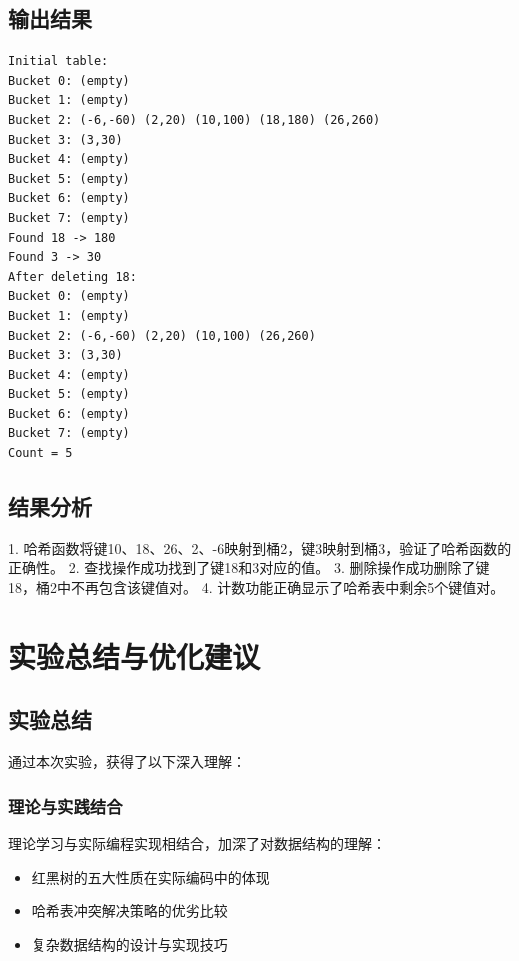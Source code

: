 \documentclass[12pt,a4paper]{article}
\begin{document}
\subsection{输出结果}
\begin{verbatim}
Initial table:
Bucket 0: (empty)
Bucket 1: (empty)
Bucket 2: (-6,-60) (2,20) (10,100) (18,180) (26,260) 
Bucket 3: (3,30) 
Bucket 4: (empty)
Bucket 5: (empty)
Bucket 6: (empty)
Bucket 7: (empty)
Found 18 -> 180
Found 3 -> 30
After deleting 18:
Bucket 0: (empty)
Bucket 1: (empty)
Bucket 2: (-6,-60) (2,20) (10,100) (26,260) 
Bucket 3: (3,30) 
Bucket 4: (empty)
Bucket 5: (empty)
Bucket 6: (empty)
Bucket 7: (empty)
Count = 5
\end{verbatim}

\subsection{结果分析}
1. 哈希函数将键10、18、26、2、-6映射到桶2，键3映射到桶3，验证了哈希函数的正确性。
2. 查找操作成功找到了键18和3对应的值。
3. 删除操作成功删除了键18，桶2中不再包含该键值对。
4. 计数功能正确显示了哈希表中剩余5个键值对。

\section{实验总结与优化建议}

\subsection{实验总结}
通过本次实验，获得了以下深入理解：

\subsubsection{理论与实践结合}
理论学习与实际编程实现相结合，加深了对数据结构的理解：
\begin{itemize}
\item 红黑树的五大性质在实际编码中的体现
\item 哈希表冲突解决策略的优劣比较
\item 复杂数据结构的设计与实现技巧
\end{itemize}
\end{document}
